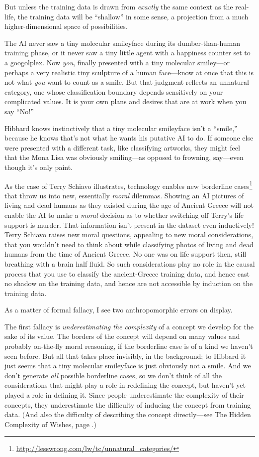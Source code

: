  But unless the training data is drawn from \textit{exactly} the
same context as the real-life, the training data will be
``shallow'' in some sense, a
projection from a much higher-dimensional space of possibilities.


 The AI never saw a tiny molecular smileyface during its
dumber-than-human training phase, or it never saw a tiny little agent
with a happiness counter set to a googolplex. Now \textit{you}, finally
presented with a tiny molecular smiley---or perhaps a very realistic
tiny sculpture of a human face---know at once that this is not what
\textit{you} want to count as a smile. But that judgment reflects an
unnatural category, one whose classification boundary depends
sensitively on your complicated values. It is your own plans and
desires that are at work when you say
``No!''


 Hibbard knows instinctively that a tiny molecular smileyface
isn't a ``smile,''
because he knows that's not what he wants his putative
AI to do. If someone else were presented with a different task, like
classifying artworks, they might feel that the Mona Lisa was obviously
smiling---as opposed to frowning, say---even though
it's only paint.


 As the case of Terry Schiavo illustrates, technology enables new
borderline cases\footnote{\url{http://lesswrong.com/lw/tc/unnatural_categories/}} that throw us into new, essentially \textit{moral}
dilemmas. Showing an AI pictures of living and dead humans as they
existed during the age of Ancient Greece will not enable the AI to make
a \textit{moral} decision as to whether switching off
Terry's life support is murder. That information
isn't present in the dataset even inductively! Terry
Schiavo raises new moral questions, appealing to new moral
considerations, that you wouldn't need to think about
while classifying photos of living and dead humans from the time of
Ancient Greece. No one was on life support then, still breathing with a
brain half fluid. So such considerations play no role in the causal
process that you use to classify the ancient-Greece training data, and
hence cast no shadow on the training data, and hence are not accessible
by induction on the training data.


 As a matter of formal fallacy, I see two anthropomorphic errors on
display.


 The first fallacy is \textit{underestimating the complexity} of a
concept we develop for the sake of its value. The borders of the
concept will depend on many values and probably on-the-fly moral
reasoning, if the borderline case is of a kind we
haven't seen before. But all that takes place
invisibly, in the background; to Hibbard it just seems that a tiny
molecular smileyface is just obviously not a smile. And we
don't generate \textit{all} possible borderline cases,
so we don't think of all the considerations that might
play a role in redefining the concept, but haven't yet
played a role in defining it. Since people underestimate the complexity
of their concepts, they underestimate the difficulty of inducing the
concept from training data. (And also the difficulty of describing the
concept directly---see The Hidden Complexity of Wishes, page \pageref{hidden_complexity_of_wishes}.)


